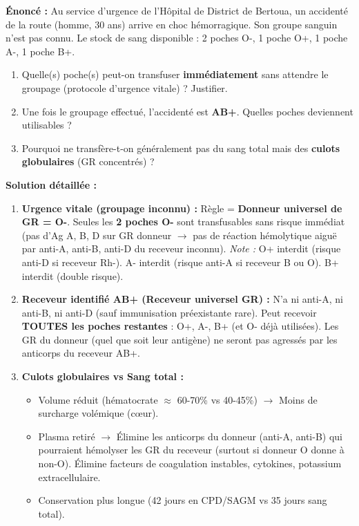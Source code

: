 \documentclass[11pt]{article}
\begin{document}
\begin{exoresolu}
\textbf{Énoncé :} Au service d'urgence de l'Hôpital de District de Bertoua, un accidenté de la route (homme, 30 ans) arrive en choc hémorragique. Son groupe sanguin n'est pas connu. Le stock de sang disponible : 2 poches O-, 1 poche O+, 1 poche A-, 1 poche B+.
\begin{enumerate}
    \item Quelle(s) poche(s) peut-on transfuser \textbf{immédiatement} sans attendre le groupage (protocole d'urgence vitale) ? Justifier.
    \item Une fois le groupage effectué, l'accidenté est \textbf{AB+}. Quelles poches deviennent utilisables ?
    \item Pourquoi ne transfère-t-on généralement pas du sang total mais des \textbf{culots globulaires} (GR concentrés) ?
\end{enumerate}
\tcblower
\textbf{Solution détaillée :}
\begin{enumerate}
    \item \textbf{Urgence vitale (groupage inconnu) :} Règle = \textbf{Donneur universel de GR = O-}.
          Seules les \textbf{2 poches O-} sont transfusables sans risque immédiat (pas d'Ag A, B, D sur GR donneur $\rightarrow$ pas de réaction hémolytique aiguë par anti-A, anti-B, anti-D du receveur inconnu).
          \emph{Note :} O+ interdit (risque anti-D si receveur Rh-). A- interdit (risque anti-A si receveur B ou O). B+ interdit (double risque).
    \item \textbf{Receveur identifié AB+ (Receveur universel GR) :} N'a ni anti-A, ni anti-B, ni anti-D (sauf immunisation préexistante rare). Peut recevoir \textbf{TOUTES les poches restantes} : O+, A-, B+ (et O- déjà utilisées). Les GR du donneur (quel que soit leur antigène) ne seront pas agressés par les anticorps du receveur AB+.
    \item \textbf{Culots globulaires vs Sang total :}
          \begin{itemize}
              \item Volume réduit (hématocrate $\approx$ 60-70\% vs 40-45\%) $\rightarrow$ Moins de surcharge volémique (cœur).
              \item Plasma retiré $\rightarrow$ Élimine les anticorps du donneur (anti-A, anti-B) qui pourraient hémolyser les GR du receveur (surtout si donneur O donne à non-O). Élimine facteurs de coagulation instables, cytokines, potassium extracellulaire.
              \item Conservation plus longue (42 jours en CPD/SAGM vs 35 jours sang total).
          \end{itemize}
\end{enumerate}
\end{exoresolu}
\end{document}
